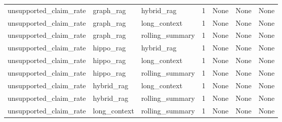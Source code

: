 \begin{tabular}{lllllll}
unsupported\_claim\_rate & graph\_rag & hybrid\_rag & 1 & None & None & None \\
unsupported\_claim\_rate & graph\_rag & long\_context & 1 & None & None & None \\
unsupported\_claim\_rate & graph\_rag & rolling\_summary & 1 & None & None & None \\
unsupported\_claim\_rate & hippo\_rag & hybrid\_rag & 1 & None & None & None \\
unsupported\_claim\_rate & hippo\_rag & long\_context & 1 & None & None & None \\
unsupported\_claim\_rate & hippo\_rag & rolling\_summary & 1 & None & None & None \\
unsupported\_claim\_rate & hybrid\_rag & long\_context & 1 & None & None & None \\
unsupported\_claim\_rate & hybrid\_rag & rolling\_summary & 1 & None & None & None \\
unsupported\_claim\_rate & long\_context & rolling\_summary & 1 & None & None & None \\
\end{tabular}
